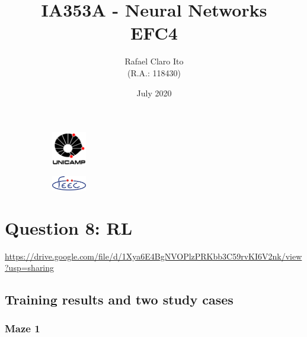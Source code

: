 \documentclass[a4paper]{article}    %
\begin{document}
\begin{figure}
    \centering
    \begin{subfigure}{0.45\textwidth}
        \centering
        \includegraphics[width=1.5cm]{unicamp}
    \end{subfigure}
    \hfill
    \begin{subfigure}{0.45\textwidth}
        \centering
        \includegraphics[width=1.5cm]{feec}
    \end{subfigure}
\end{figure}

\title{
    \vspace{5cm}
    IA353A - Neural Networks\\
    EFC4
    \vspace{1cm}
}
\author{
    Rafael Claro Ito\\
    (R.A.: 118430)
    \vspace{11cm}
}
\date{July 2020}
\maketitle
\newpage

\section*{Question 8: RL}
\addtocounter{section}{8}

\href{https://drive.google.com/file/d/1Xya6E4BgNVOPlzPRKbb3C59rvKI6V2nk/view?usp=sharing}{https://drive.google.com/file/d/1Xya6E4BgNVOPlzPRKbb3C59rvKI6V2nk/view?usp=sharing}

\subsection{Training results and two study cases}

\subsubsection{Maze 1}
\end{document}
